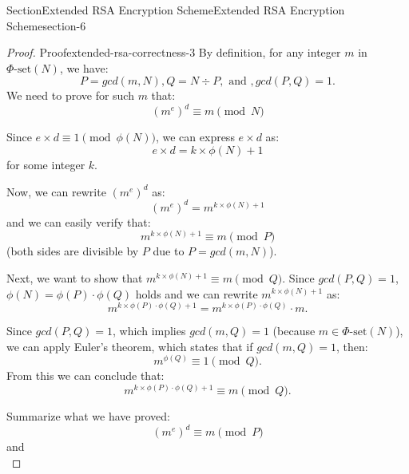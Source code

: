 \documentclass[oneside,12pt,]{article}
\numberwithin{equation}{section}
\begin{document}
\begin{sectionptx}{Section}{Extended RSA Encryption Scheme}{}{Extended RSA Encryption Scheme}{}{}{section-6}
\begin{proof}{Proof}{}{extended-rsa-correctness-3}
By definition, for any integer \(m\) in \(\Phi\text{-set}(N)\), we have:%
\begin{equation*}
P = gcd(m,N), Q = N \div P, \text{ and }, gcd(P,Q) = 1.
\end{equation*}
We need to prove for such \(m\) that:%
\begin{equation*}
(m^e)^d \equiv m \pmod{N}
\end{equation*}
%
\par
Since \(e \times d \equiv 1 \pmod{\phi(N)}\), we can express \(e \times d\) as:%
\begin{equation*}
e \times d = k \times \phi(N) + 1
\end{equation*}
for some integer \(k\).%
\par
Now, we can rewrite \((m^e)^d\) as:%
\begin{equation*}
(m^e)^d = m^{k \times \phi(N) + 1}
\end{equation*}
and we can easily verify that:%
\begin{equation*}
m^{k \times \phi(N) + 1} \equiv m \pmod{P}
\end{equation*}
(both sides are divisible by \(P\) due to \(P = gcd(m,N)\)).%
\par
Next, we want to show that \(m^{k \times \phi(N) + 1} \equiv m \pmod{Q}\). Since \(gcd(P,Q) = 1\), \(\phi(N) = \phi(P) \cdot \phi(Q)\) holds and we can rewrite \(m^{k \times \phi(N) + 1}\) as:%
\begin{equation*}
m^{k \times \phi(P) \cdot \phi(Q) + 1} = m^{k \times \phi(P) \cdot \phi(Q)} \cdot m\text{.}
\end{equation*}
%
\par
Since \(gcd(P,Q) = 1\), which implies \(gcd(m,Q) = 1\) (because \(m \in \Phi\text{-set}(N)\)), we can apply Euler's theorem, which states that if \(gcd(m,Q) = 1\), then:%
\begin{equation*}
m^{\phi(Q)} \equiv 1 \pmod{Q}\text{.}
\end{equation*}
From this we can conclude that:%
\begin{equation*}
m^{k \times \phi(P) \cdot \phi(Q) + 1} \equiv m \pmod{Q}\text{.}
\end{equation*}
%
\par
Summarize what we have proved:%
\begin{equation*}
(m^e)^d \equiv m \pmod{P}
\end{equation*}
and%
\begin{equation*}

\end{equation*}
\end{proof}
\end{sectionptx}
\end{document}

